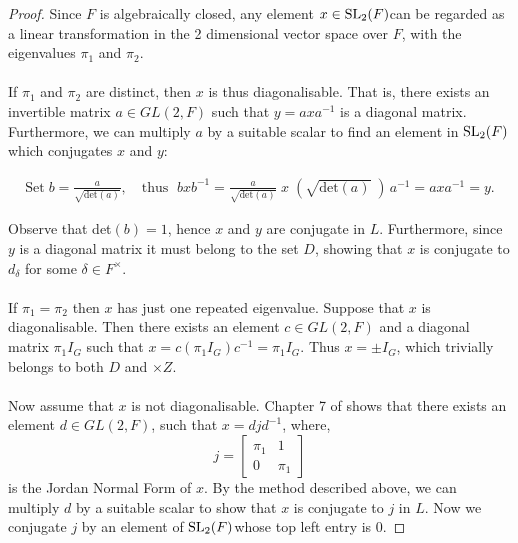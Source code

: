 \begin{proof}
\leanok Since $F$ is algebraically closed, any element $x \in \operatorname{SL}_2(F)$can be regarded as a linear transformation in the 2 dimensional vector space over $F$, with the eigenvalues $\pi_1$ and $\pi_2$. \\
\\
\space If $\pi_1$ and $\pi_2$ are distinct, then $x$ is thus diagonalisable. That is, there exists an invertible matrix $a \in GL(2, F)$ such that $y = axa^{-1}$ is a diagonal matrix. Furthermore, we can multiply $a$ by a suitable scalar to find an element in $\operatorname{SL}_2(F)$which conjugates $x$ and $y$:

\begin{align*}
    \text{Set} \; b = \frac{a}{\sqrt {\text{det}(a)}}, \quad \text{thus } \; bxb^{-1} =\frac{a}{\sqrt {\text{det}(a)}} \; x \; (\sqrt{\text{det}(a)} \; )\,a^{-1} = axa^{-1} = y.
\end{align*}

Observe that det$(b)=1$, hence $x$ and $y$ are conjugate in $L$. Furthermore, since $y$ is a diagonal matrix it must belong to the set $D$, showing that $x$ is conjugate to $d_\delta$ for some $\delta \in F^\times$. \\
\\
\space If $\pi_1 = \pi_2$ then $x$ has just one repeated eigenvalue. Suppose that $x$ is diagonalisable. Then there exists an element $c \in GL(2, F)$ and a diagonal matrix $\pi_1 I_G$ such that $x = c(\pi_1 I_G)c^{-1} = \pi_1 I_G$. Thus $x = \pm I_G$, which trivially belongs to both $D$ and $\times Z$. \\
\\
Now assume that $x$ is not diagonalisable. Chapter 7 of \cite{matrix} shows that there exists an element $d \in GL(2, F)$, such that $x= djd^{-1}$, where, $$j = \begin{bmatrix} \pi_1 & 1 \\ 0 & \pi_1 \end{bmatrix}$$ is the Jordan Normal Form of $x$. By the method described above, we can multiply $d$ by a suitable scalar to show that $x$ is conjugate to $j$ in $L$. Now we conjugate $j$ by an element of $\operatorname{SL}_2(F)$whose top left entry is 0.


\end{proof}
